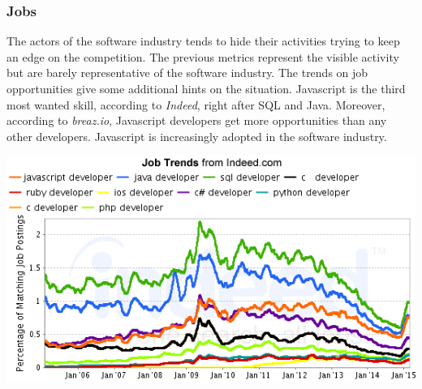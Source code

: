 


\subsubsection{Jobs}

The actors of the software industry tends to hide their activities trying to keep an edge on the competition.
The previous metrics represent the visible activity but are barely representative of the software industry.
The trends on job opportunities give some additional hints on the situation.
Javascript is the third most wanted skill, according to \textit{Indeed}, right after SQL and Java.
Moreover, according to \textit{breaz.io}, Javascript developers get more opportunities than any other developers.
Javascript is increasingly adopted in the software industry.

\includegraphics[width=0.9\linewidth]{../../data/js-trends/jobgraph}

